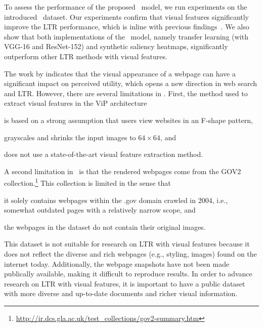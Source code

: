 To assess the performance of the proposed \modelname~model, we run experiments on the introduced \datasetname~dataset.
Our experiments confirm that visual features significantly improve the \ac{LTR} performance, which is inline with previous findings~\cite{fan2017learning}.
We also show that both implementations of the \modelname~model, namely transfer learning (with VGG-16 and ResNet-152) and synthetic saliency heatmaps,
significantly outperform other \ac{LTR} methods with visual features.

The work by \citet{fan2017learning} indicates that the visual appearance of a webpage can have a significant impact on perceived utility, which opens a new direction in web search and \ac{LTR}.
However, there are several limitations in \cite{fan2017learning}.
First, the method used to extract visual features in the ViP architecture
\begin{inparaenum}[(i)]
\item is based on a strong assumption that users view websites in an F-shape pattern, 
\item grayscales and shrinks the input images to $64\times64$, and
\item does not use a state-of-the-art visual feature extraction method.
\end{inparaenum}

A second limitation in~\citep{fan2017learning} is that
the rendered webpages come from the GOV2 collection.\footnote{\url{http://ir.dcs.gla.ac.uk/test_collections/gov2-summary.htm}}
This collection is limited in the sense that 
\begin{inparaenum}[(i)]
\item it solely contains webpages within the .gov domain crawled in 2004, i.e., somewhat outdated pages with a relatively narrow scope, and
\item the webpages in the dataset do not contain their original images.
\end{inparaenum}
This dataset is not suitable for research on \ac{LTR} with visual features because it does not reflect the diverse and rich webpages (e.g., styling, images) found on the internet today. 
Additionally, the webpage snapshots have not been made publically available, making it difficult to reproduce results. 
In order to advance research on \ac{LTR} with visual features, it is important to have a public dataset with more diverse and up-to-date documents and richer visual information.
\fi


